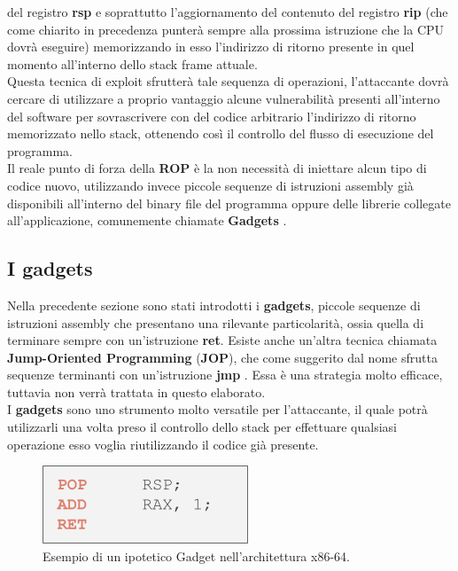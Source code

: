 del registro \textbf{rsp} e soprattutto l'aggiornamento del contenuto del registro \textbf{rip} (che come chiarito in precedenza punterà sempre alla prossima istruzione che la CPU dovrà eseguire) memorizzando in esso
l'indirizzo di ritorno presente in quel momento all'interno dello stack frame attuale.\\
Questa tecnica di exploit sfrutterà tale sequenza di operazioni, l'attaccante dovrà cercare di utilizzare a proprio vantaggio alcune vulnerabilità presenti all'interno del software per sovrascrivere con del codice 
arbitrario l'indirizzo di ritorno memorizzato nello stack, ottenendo così il controllo del flusso di esecuzione del programma.\\
Il reale punto di forza della \textbf{ROP} è la non necessità di iniettare alcun tipo di codice nuovo, utilizzando invece piccole sequenze di istruzioni assembly già disponibili all'interno del binary file del programma
oppure delle librerie collegate all'applicazione, comunemente chiamate \textbf{Gadgets} \cite*{ROP-Basics}.

\subsection{I gadgets}
\label{subsec:gadgets}
Nella precedente sezione sono stati introdotti i \textbf{gadgets}, piccole sequenze di istruzioni assembly che presentano una rilevante particolarità, ossia quella di terminare sempre con un'istruzione \textbf{ret}. 
Esiste anche un'altra tecnica chiamata \label{jop}\textbf{Jump-Oriented Programming} (\textbf{JOP}), che come suggerito dal nome sfrutta sequenze terminanti con un'istruzione \textbf{jmp} \cite*{JOP}\cite*{JOP2}. Essa è una strategia molto efficace, tuttavia 
non verrà trattata in questo elaborato.\\
I \textbf{gadgets} sono uno strumento molto versatile per l'attaccante, il quale potrà utilizzarli una volta preso il controllo dello stack per effettuare qualsiasi operazione esso voglia riutilizzando il codice già presente.\\

\begin{figure}[ht]
    \centerline{\includegraphics[scale=.6]{images/Gadget.png}}
    \caption{Esempio di un ipotetico Gadget nell'architettura x86-64.}
    \label{fig:Gadget}
\end{figure}


